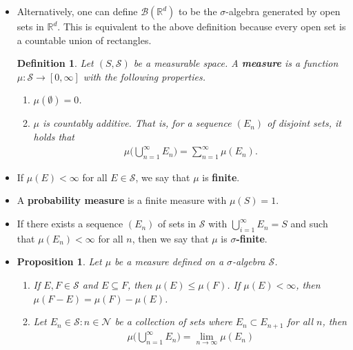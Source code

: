 \documentclass[10pt]{article}
\newtheorem{definition}[lemma]{Definition}
\newtheorem{proposition}[lemma]{Proposition}
\newcommand{\mcal}[1]{\mathcal{#1}}
\newcommand{\Real}{\mathbb{R}}
\begin{document}
\begin{itemize}
  \item Alternatively, one can define $\mcal{B}(\Real^d)$ to be the $\sigma$-algebra generated by open sets in $\Real^d$. This is equivalent to the above definition because every open set is a countable union of rectangles.

  \begin{definition}
    Let $(S, \mcal{S})$ be a measurable space. A {\bf measure} is a function $\mu: \mcal{S} \rightarrow [0, \infty]$ with the following properties.
    \begin{enumerate}
      \item $\mu(\emptyset) = 0$.
      \item $\mu$ is countably additive. That is, for a sequence $(E_n)$ of disjoint sets, it holds that
      \begin{align*}
        \mu\bigg( \bigcup_{n=1}^\infty E_n \bigg) = \sum_{n=1}^\infty \mu(E_n).
      \end{align*}
    \end{enumerate}
  \end{definition}

  \item If $\mu(E) < \infty$ for all $E \in \mcal{S}$, we say that $\mu$ is {\bf finite}.
  
  \item A {\bf probability measure} is a finite measure with $\mu(S) = 1$.
  
  \item If there exists a sequence $(E_n)$ of sets in $\mcal{S}$ with $\bigcup_{i=1}^\infty E_n = S$ and such that $\mu(E_n) < \infty$ for all $n$, then we say that $\mu$ is {\bf $\sigma$-finite}.
  
  \item \begin{proposition}
    Let $\mu$ be a measure defined on a $\sigma$-algebra $\mcal{S}$. 
    \begin{enumerate}
      \item If $E, F \in \mcal{S}$ and $E \subseteq F$, then $\mu(E) \leq \mu(F)$. If $\mu(E) < \infty$, then $\mu(F - E) = \mu(F) - \mu(E)$.
      
      \item Let ${E_n \in \mcal{S}: n \in \mcal{N}}$ be a collection of sets where $E_n \subset E_{n+1}$ for all $n$, then
      \begin{align*}
        \mu\bigg( \bigcup_{n=1}^\infty E_n \bigg) = \lim_{n \rightarrow \infty} \mu(E_n)
      \end{align*}


\end{enumerate}
\end{proposition}
\end{itemize}
\end{document}
